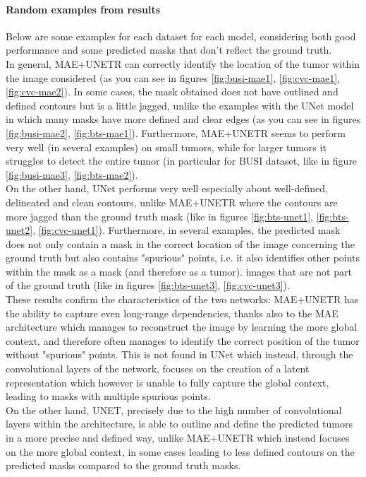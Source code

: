 \paragraph{Random examples from results}
Below are some examples for each dataset for each model, considering both good performance and some predicted masks that don't reflect the ground truth.\\
In general, MAE+UNETR can correctly identify the location of the tumor within the image considered (as you can see in figures \ref{fig:busi-mae1}, \ref{fig:cvc-mae1}, \ref{fig:cvc-mae2}). In some cases, the mask obtained does not have outlined and defined contours but is a little jagged, unlike the examples with the UNet model in which many masks have more defined and clear edges (as you can see in figures \ref{fig:busi-mae2}, \ref{fig:bts-mae1}).
Furthermore, MAE+UNETR seems to perform very well (in several examples) on small tumors, while for larger tumors it struggles to detect the entire tumor (in particular for BUSI dataset, like in figure \ref{fig:busi-mae3}, \ref{fig:bts-mae2}).\\

On the other hand, UNet performs very well especially about well-defined, delineated and clean contours, unlike MAE+UNETR where the contours are more jagged than the ground truth mask (like in figures \ref{fig:bts-unet1}, \ref{fig:bts-unet2}, \ref{fig:cvc-unet1}). Furthermore, in several examples, the predicted mask does not only contain a mask in the correct location of the image concerning the ground truth but also contains "spurious" points, i.e. it also identifies other points within the mask as a mask (and therefore as a tumor). images that are not part of the ground truth (like in figures \ref{fig:bts-unet3}, \ref{fig:cvc-unet3}).\\

These results confirm the characteristics of the two networks: MAE+UNETR has the ability to capture even long-range dependencies, thanks also to the MAE architecture which manages to reconstruct the image by learning the more global context, and therefore often manages to identify the correct position of the tumor without "spurious" points.
This is not found in UNet which instead, through the convolutional layers of the network, focuses on the creation of a latent representation which however is unable to fully capture the global context, leading to masks with multiple spurious points.\\

On the other hand, UNET, precisely due to the high number of convolutional layers within the architecture, is able to outline and define the predicted tumors in a more precise and defined way, unlike MAE+UNETR which instead focuses on the more global context, in some cases leading to less defined contours on the predicted masks compared to the ground truth masks.

